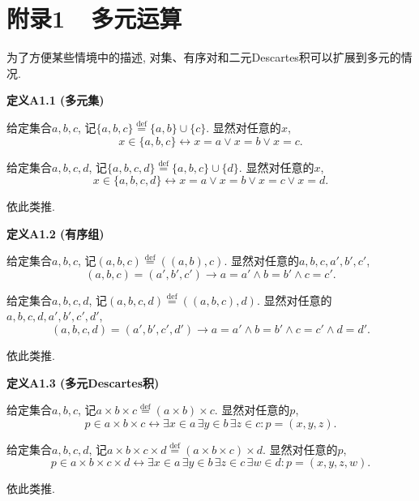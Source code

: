 \documentclass[UTF8]{ctexart}
\begin{document}
\vspace{20pt}

\section*{附录1\ \ 多元运算}

为了方便某些情境中的描述, 对集、有序对和二元Descartes积可以扩展到多元的情况.

\vspace{10pt}

\hypertarget{sec:定义A1.1}{}
\noindent\textbf{定义A1.1 (多元集)}

给定集合$a,b,c$, 记$\{a,b,c\}\overset{\mathrm{def}}{=}\{a,b\}\cup\{c\}$.
显然对任意的$x$,
\[
    x\in\{a,b,c\}\leftrightarrow x=a\lor x=b\lor x=c.
\]

给定集合$a,b,c,d$, 记$\{a,b,c,d\}\overset{\mathrm{def}}{=}\{a,b,c\}\cup\{d\}$.
显然对任意的$x$,
\[
    x\in\{a,b,c,d\}\leftrightarrow x=a\lor x=b\lor x=c\lor x=d.
\]

依此类推.

\vspace{10pt}

\hypertarget{sec:定义A1.2}{}
\noindent\textbf{定义A1.2 (有序组)}

给定集合$a,b,c$, 记$(a,b,c)\overset{\mathrm{def}}{=}((a,b),c)$.
显然对任意的$a,b,c,a',b',c'$,
\[
    (a,b,c)=(a',b',c')\to a=a'\land b=b'\land c=c'.
\]

给定集合$a,b,c,d$, 记$(a,b,c,d)\overset{\mathrm{def}}{=}((a,b,c),d)$.
显然对任意的$a,b,c,d,a',b',c',d'$,
\[
    (a,b,c,d)=(a',b',c',d')\to a=a'\land b=b'\land c=c'\land d=d'.
\]

依此类推.

\vspace{10pt}

\hypertarget{sec:定义A1.3}{}
\noindent\textbf{定义A1.3 (多元Descartes积)}

给定集合$a,b,c$, 记$a\times b\times c\overset{\mathrm{def}}{=}
(a\times b)\times c$. 显然对任意的$p$,
\[
    p\in a\times b\times c\leftrightarrow
    \exists x\in a\,\exists y\in b\,\exists z\in c:p=(x,y,z).
\]

给定集合$a,b,c,d$, 记$a\times b\times c\times d\overset{\mathrm{def}}{=}
(a\times b\times c)\times d$. 显然对任意的$p$,
\[
    p\in a\times b\times c\times d\leftrightarrow
    \exists x\in a\,\exists y\in b\,\exists z\in c\,\exists w\in d:p=(x,y,z,w).
\]

依此类推.
\end{document}
